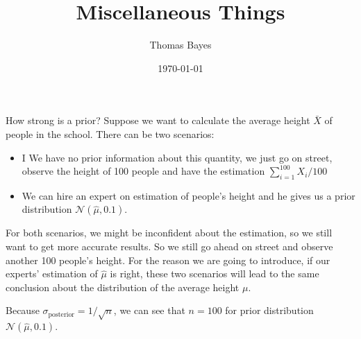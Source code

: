 \documentclass{beamer}
\title{Miscellaneous Things}
\author{Thomas Bayes}
\institute{
\texttt{[image: ../bayes.png]}%
}
\date{\today}
\begin{document}
    
\frame{\titlepage}

\begin{frame}[allowframebreaks]{How strong is a prior?}
Suppose we want to calculate the average height $\bar{X}$ of people in the school. There can be two scenarios: 
\begin{itemize}
\item I We have no prior information about this quantity, we just go on street, observe the height of 100 people and have the estimation $\sum_{i=1}^100{X_i} / 100$
\item We can hire an expert on estimation of people's height and he gives us a prior distribution $\mathcal{N}(\hat{\mu}, 0.1)$.
\end{itemize}
For both scenarios, we might be inconfident about the estimation, so we still want to get more accurate results. So we still go ahead on street and observe another 100 people's height. For the reason we are going to introduce, if our experts' estimation of $\hat{\mu}$ is right, these two scenarios will lead to the same conclusion about the distribution of the average height $\mu$.

\framebreak

Because $\sigma_\text{posterior} = 1/ \sqrt{n}$, we can see that $n = 100$ for prior
distribution $\mathcal{N}(\hat{\mu},0.1)$.
\end{frame}
\end{document}
